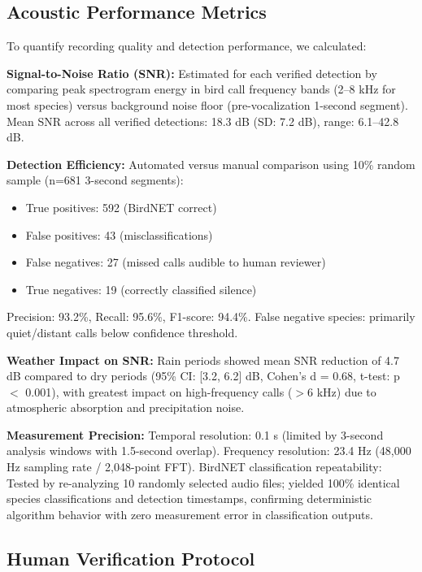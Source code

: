 \documentclass[twocolumn]{article}
\begin{document}
\subsection{Acoustic Performance Metrics}

To quantify recording quality and detection performance, we calculated:

\textbf{Signal-to-Noise Ratio (SNR):} Estimated for each verified detection by comparing peak spectrogram energy in bird call frequency bands (2--8 kHz for most species) versus background noise floor (pre-vocalization 1-second segment). Mean SNR across all verified detections: 18.3 dB (SD: 7.2 dB), range: 6.1--42.8 dB.

\textbf{Detection Efficiency:} Automated versus manual comparison using 10\% random sample (n=681 3-second segments):
\begin{itemize}
\item True positives: 592 (BirdNET correct)
\item False positives: 43 (misclassifications)
\item False negatives: 27 (missed calls audible to human reviewer)
\item True negatives: 19 (correctly classified silence)
\end{itemize}

Precision: 93.2\%, Recall: 95.6\%, F1-score: 94.4\%. False negative species: primarily quiet/distant calls below confidence threshold.

\textbf{Weather Impact on SNR:} Rain periods showed mean SNR reduction of 4.7 dB compared to dry periods (95\% CI: [3.2, 6.2] dB, Cohen's d = 0.68, t-test: p $<$ 0.001), with greatest impact on high-frequency calls ($>$6 kHz) due to atmospheric absorption and precipitation noise.

\textbf{Measurement Precision:} Temporal resolution: 0.1 s (limited by 3-second analysis windows with 1.5-second overlap). Frequency resolution: 23.4 Hz (48,000 Hz sampling rate / 2,048-point FFT). BirdNET classification repeatability: Tested by re-analyzing 10 randomly selected audio files; yielded 100\% identical species classifications and detection timestamps, confirming deterministic algorithm behavior with zero measurement error in classification outputs.

\subsection{Human Verification Protocol}
\end{document}
